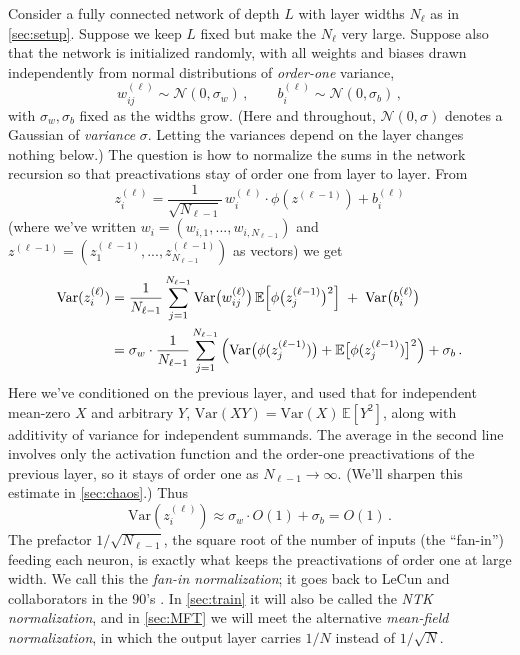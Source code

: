 \documentclass[11pt]{article}
\newcommand{\E}{\mathbb{E}}
\newcommand{\CN}{{\mathcal N}}
\begin{document}
Consider a fully connected network of depth $L$ with layer widths $N_\ell$ as in \cref{sec:setup}. Suppose we keep $L$ fixed but make the $N_\ell$ very large. Suppose also that the network is initialized randomly, with all weights and biases drawn independently from normal distributions of \emph{order-one} variance,
%
\begin{equation} \label{init-O1}
    w_{ij}^{(\ell)} \sim \CN(0,\sigma_w)\,,\qquad b_i^{(\ell)}\sim \CN(0,\sigma_b)\,,
\end{equation}
%
with $\sigma_w,\sigma_b$ fixed as the widths grow. (Here and throughout, $\CN(0,\sigma)$ denotes a Gaussian of \emph{variance} $\sigma$. Letting the variances depend on the layer changes nothing below.) The question is how to normalize the sums in the network recursion so that preactivations stay of order one from layer to layer. From
%
\begin{equation}
   z_i^{(\ell)} = \frac{1}{\sqrt{N_{\ell-1}}}\, w_i^{(\ell)} \cdot \phi(z^{(\ell-1)}) + b_i^{(\ell)}
\end{equation}
%
(where we've written $w_i=(w_{i,1},...,w_{i,N_{\ell-1}})$ and $z^{(\ell-1)} = (z^{(\ell-1)}_1,...,z^{(\ell-1)}_{N_{\ell-1}})$ as vectors) we get
%
\begin{align}
    \text{Var}(z_i^{(\ell)}) &= \frac{1}{N_{\ell-1}}\sum_{j=1}^{N_{\ell-1}} \text{Var}\big(w_{ij}^{(\ell)}\big)\, \E\Big[\phi\big(z_j^{(\ell-1)}\big)^2\Big] \;+\; \text{Var}\big(b_i^{(\ell)}\big) \notag \\
    &= \sigma_w \cdot \frac{1}{N_{\ell-1}}\sum_{j=1}^{N_{\ell-1}}\Big( \text{Var}\big(\phi(z_j^{(\ell-1)})\big)+\E\big[\phi(z_j^{(\ell-1)})\big]^2\Big) +\sigma_b\,.
\end{align}
%
Here we've conditioned on the previous layer, and used that for independent mean-zero $X$ and arbitrary $Y$, $\text{Var}(XY) = \text{Var}(X)\,\E[Y^2]$, along with additivity of variance for independent summands. The average in the second line involves only the activation function and the order-one preactivations of the previous layer, so it stays of order one as $N_{\ell-1}\to\infty$. (We'll sharpen this estimate in \cref{sec:chaos}.) Thus
%
\begin{equation} \label{fanin}
    \text{Var}(z_i^{(\ell)}) \approx \sigma_w\cdot O(1) + \sigma_b = O(1)\,.
\end{equation}
%
The prefactor $1/\sqrt{N_{\ell-1}}$, the square root of the number of inputs (the ``fan-in'') feeding each neuron, is exactly what keeps the preactivations of order one at large width. We call this the \emph{fan-in normalization}; it goes back to LeCun and collaborators in the 90's \cite{lecun1998efficient}. In \cref{sec:train} it will also be called the \emph{NTK normalization}, and in \cref{sec:MFT} we will meet the alternative \emph{mean-field normalization}, in which the output layer carries $1/N$ instead of $1/\sqrt N$.
\end{document}
